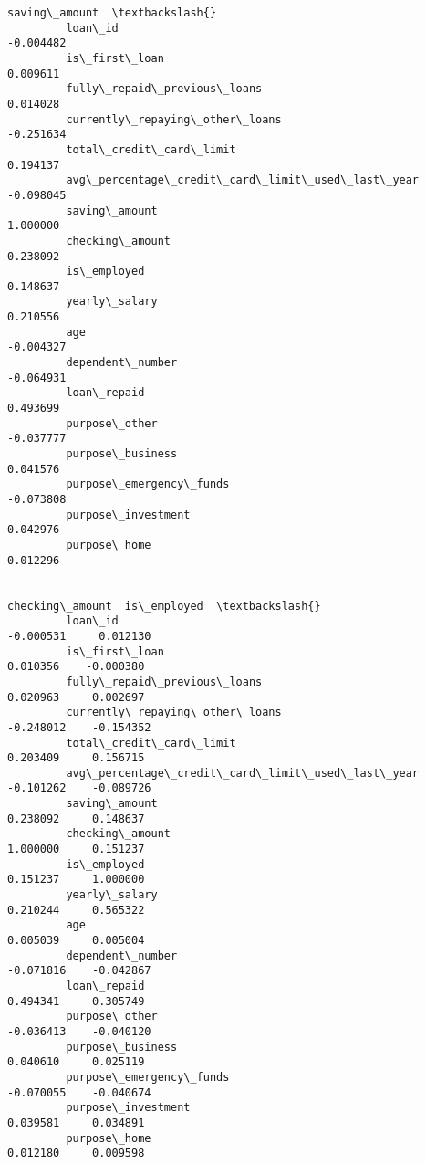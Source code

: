 \documentclass{report}
\begin{document}
\begin{Verbatim}[commandchars=\\\{\}]
                                                          saving\_amount  \textbackslash{}
         loan\_id                                              -0.004482   
         is\_first\_loan                                         0.009611   
         fully\_repaid\_previous\_loans                           0.014028   
         currently\_repaying\_other\_loans                       -0.251634   
         total\_credit\_card\_limit                               0.194137   
         avg\_percentage\_credit\_card\_limit\_used\_last\_year      -0.098045   
         saving\_amount                                         1.000000   
         checking\_amount                                       0.238092   
         is\_employed                                           0.148637   
         yearly\_salary                                         0.210556   
         age                                                  -0.004327   
         dependent\_number                                     -0.064931   
         loan\_repaid                                           0.493699   
         purpose\_other                                        -0.037777   
         purpose\_business                                      0.041576   
         purpose\_emergency\_funds                              -0.073808   
         purpose\_investment                                    0.042976   
         purpose\_home                                          0.012296   
         
                                                          checking\_amount  is\_employed  \textbackslash{}
         loan\_id                                                -0.000531     0.012130   
         is\_first\_loan                                           0.010356    -0.000380   
         fully\_repaid\_previous\_loans                             0.020963     0.002697   
         currently\_repaying\_other\_loans                         -0.248012    -0.154352   
         total\_credit\_card\_limit                                 0.203409     0.156715   
         avg\_percentage\_credit\_card\_limit\_used\_last\_year        -0.101262    -0.089726   
         saving\_amount                                           0.238092     0.148637   
         checking\_amount                                         1.000000     0.151237   
         is\_employed                                             0.151237     1.000000   
         yearly\_salary                                           0.210244     0.565322   
         age                                                     0.005039     0.005004   
         dependent\_number                                       -0.071816    -0.042867   
         loan\_repaid                                             0.494341     0.305749   
         purpose\_other                                          -0.036413    -0.040120   
         purpose\_business                                        0.040610     0.025119   
         purpose\_emergency\_funds                                -0.070055    -0.040674   
         purpose\_investment                                      0.039581     0.034891   
         purpose\_home                                            0.012180     0.009598   
         

\end{Verbatim}
\end{document}
